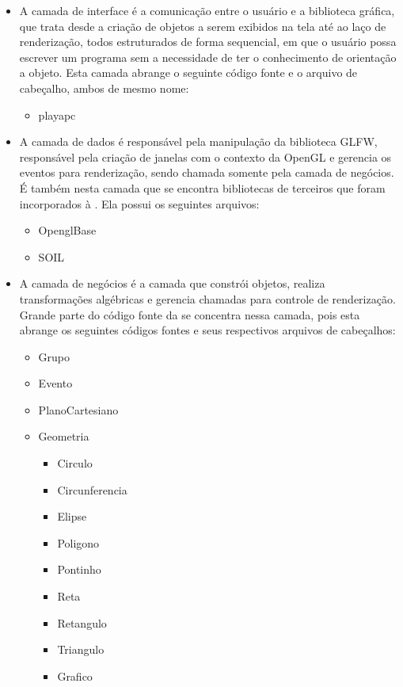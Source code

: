 \begin{itemize}
\item A camada de interface é a comunicação entre o usuário e a biblioteca gráfica,
que trata desde  a criação de objetos a serem exibidos  na tela até ao
laço de renderização, todos estruturados de forma sequencial, em que o
usuário  possa  escrever  um  programa  sem a  necessidade  de  ter  o
conhecimento de orientação a objeto. Esta camada abrange o seguinte código fonte e o arquivo de cabeçalho, ambos de mesmo nome:
  \begin{itemize}
    \item playapc
  \end{itemize}

\item A camada de  dados é responsável pela manipulação  da biblioteca GLFW,
responsável  pela  criação de  janelas  com  o  contexto da  OpenGL  e
gerencia  os eventos  para  renderização, sendo  chamada somente  pela
camada de negócios. É também nesta camada que se encontra bibliotecas de terceiros que foram incorporados à \playAPC{}. Ela possui os seguintes arquivos:
  \begin{itemize}
    \item OpenglBase
    \item SOIL
  \end{itemize}

\item A  camada  de  negócios  é  a camada  que  constrói  objetos,  realiza
transformações  algébricas  e   gerencia  chamadas  para  controle  de
renderização.  Grande parte do código fonte da \playAPC{} se concentra nessa camada, pois esta abrange os seguintes códigos fontes e seus respectivos arquivos de cabeçalhos:
  \begin{itemize}
    \item Grupo
    \item Evento
    \item PlanoCartesiano
    \item Geometria
      \begin{itemize}
        \item Circulo
        \item Circunferencia
        \item Elipse
        \item Poligono
        \item Pontinho
        \item Reta
        \item Retangulo
        \item Triangulo
        \item Grafico
      \end{itemize}
  \end{itemize}
\end{itemize}


